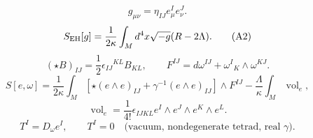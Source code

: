 \documentclass{article}
\newcommand{\Vol}{\operatorname{vol}}
\begin{document}
\begin{equation}
g_{\mu\nu}=\eta_{IJ}e^I_\mu e^J_\nu.
\tag{A1}
\end{equation}
\begin{equation}
S_{\rm EH}[g]=\frac1{2\kappa}\int_Md^4x\sqrt{-g}(R-2\Lambda).
\tag{A2}
\end{equation}
\begin{equation}
(\star B)_{IJ}=\frac12\epsilon_{IJ}{}^{KL}B_{KL},\qquad F^{IJ}=d\omega^{IJ}+\omega^I{}_K\wedge\omega^{KJ}.
\tag{A3}
\end{equation}
\begin{equation}
S[e,\omega]=\frac1{2\kappa}\int_M\left[\star(e\wedge e)_{IJ}+\gamma^{-1}(e\wedge e)_{IJ}\right]\wedge F^{IJ}-\frac{\Lambda}{\kappa}\int_M\Vol_e,
\tag{A4}
\end{equation}
\begin{equation}
\Vol_e=\frac1{4!}\epsilon_{IJKL}e^I\wedge e^J\wedge e^K\wedge e^L.
\tag{A5}
\end{equation}
\begin{equation}
T^I=D_\omega e^I,\qquad T^I=0\quad\text{(vacuum, nondegenerate tetrad, real $\gamma$).}
\tag{A6}
\end{equation}
\end{document}
